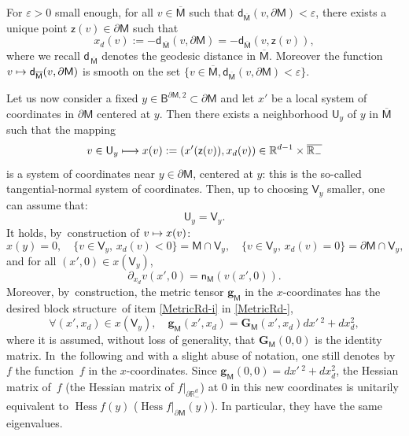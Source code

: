 \documentclass[10pt]{amsart}
\newcommand\mto{\mathchoice{\longmapsto}{\mapsto}{\mapsto}{\mapsto}}
\newcommand{\mbf}[1]{\mathbf{#1}}
\let\pa\partial
\let\ve\varepsilon
\DeclareMathOperator{\hess}{Hess}\let\Hess\hess
\theoremstyle{plain}
\theoremstyle{definition}
\begin{document}
For $\ve>0$ small enough, for all $v\in \overline { \mathsf M}$ such that $\mathsf d_{\overline { \mathsf M}}(v,\pa \mathsf M)<\ve$, there exists a unique
point $\mathsf z(v)\in \pa \mathsf M$ such that
\[
x_d(v):=-\mathsf d_{\, \overline {\mathsf M}}(v,\pa \mathsf M)=-\mathsf d_{ \overline {\mathsf M}}(v,\mathsf z(v)),
\]
where we recall $\mathsf d_{\, \overline{\mathsf M}}$ denotes the
geodesic distance in $ \overline {\mathsf M}$. Moreover the function
$v\mto \mathsf d_{ \overline {\mathsf M}}(v,\partial \mathsf M)$ is smooth on the set $\{v\in \overline {\mathsf M}, \mathsf d_{\overline{ \mathsf M}}(v,\pa {\mathsf M})<\ve\}$.

Let us now consider a fixed $y\in \mathsf B^{\pa \mathsf M,2}\subset \pa \mathsf M$ and let $x'$ be a local system of coordinates in $\pa \mathsf M$ centered at $y$. Then there exists a neighborhood $\mathsf U_y$ of $y$ in $\overline {\mathsf M}$ such that the mapping\begin{equation}\label{eq.norm-teng}
v\in \mathsf U_y \mto x(v):=(x'(\mathsf z(v)),x_d(v))\in \mathbb R^{d-1}\times \overline{\mathbb R_-}
\end{equation}
is a system of coordinates near $y\in \pa \mathsf M$, centered at
$y$: this is the so-called tangential-normal system of coordinates. Then, up to choosing $\mathsf V_y$ smaller, one can assume that:
\[
\mathsf U_y=\mathsf V_y.
\]
It holds, by~construction of $v\mto x(v)$:
\[
x(y)=0,\quad \{v\in \mathsf V_y, \, x_d(v)<0\}= \mathsf M\cap \mathsf V_y,\quad
\{v\in \mathsf V_y,\, x_d(v)=0\}=\pa \mathsf M \cap \mathsf V_y,
\]
and for all $(x',0)\in x(\mathsf V_y)$,
\[
\pa _{x_d}v(x',0) = \mathsf n_{\mathsf M}(v(x',0)).
\]
Moreover, by~construction, the metric tensor $\mbf g_{\mathsf M}$ in the $x$-coordinates has the desired block structure~of item \eqref{MetricRd-i} in \ref{MetricRd-}, \ie
\begin{equation}\label{g_y}
\forall (x',x_d)\in x(\mathsf V_y), \quad \mbf g_{\mathsf M}(x',x_d)=\mbf G_{\mathsf M}(x',x_d)dx'\,^2+dx_d^2,
\end{equation}
where it is assumed, without loss of generality, that $\mbf G_{\mathsf
M} (0,0)$ is the identity matrix. In~the following and with a slight abuse of notation, one still
denotes by $f$ the function~$f$ in the $x$-coordinates. Since $\mbf
g_{\mathsf M}(0,0)= dx'\,^2+dx_d^2$, the
Hessian matrix of~$f$ (\resp the Hessian matrix of
$f|_{\partial \mathbb R_-^d}$) at $0$ in this new coordinates is unitarily equivalent
to $\hess f(y)$ (\resp $\hess f|_{\partial \mathsf M}(y)$). In
particular, they have the same eigenvalues.
\end{document}
